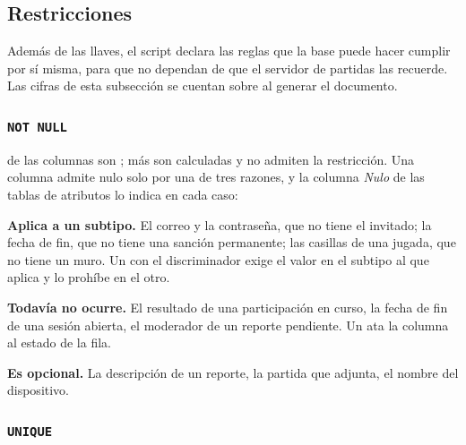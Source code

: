 \subsection*{Restricciones}

Además de las llaves, el script declara las reglas que la base puede hacer cumplir por sí misma, para que no dependan de que el servidor de partidas las recuerde. Las cifras de esta subsección se cuentan sobre  al generar el documento.

\subsubsection*{\texttt{NOT NULL}}

\bdNumNoNulas{} de las \bdNumColumnas{} columnas son ; \bdNumCalculadas{} más son calculadas y no admiten la restricción. Una columna admite nulo solo por una de tres razones, y la columna \emph{Nulo} de las tablas de atributos lo indica en cada caso:

\begin{reglas}
  \item \textbf{Aplica a un subtipo.} El correo y la contraseña, que no tiene el invitado; la fecha de fin, que no tiene una sanción permanente; las casillas de una jugada, que no tiene un muro. Un  con el discriminador exige el valor en el subtipo al que aplica y lo prohíbe en el otro.
  \item \textbf{Todavía no ocurre.} El resultado de una participación en curso, la fecha de fin de una sesión abierta, el moderador de un reporte pendiente. Un  ata la columna al estado de la fila.
  \item \textbf{Es opcional.} La descripción de un reporte, la partida que adjunta, el nombre del dispositivo.
\end{reglas}

\subsubsection*{\texttt{UNIQUE}}

